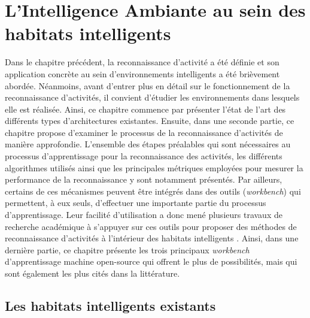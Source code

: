 \chapter{L'Intelligence Ambiante au sein des habitats intelligents}
\label{chap:2}

Dans le chapitre précédent, la reconnaissance d'activité a été définie et son application concrète au sein d'environnements intelligents a été brièvement abordée. Néanmoins, avant d'entrer plus en détail sur le fonctionnement de la reconnaissance d'activités, il convient d'étudier les environnements dans lesquels elle est réalisée. Ainsi, ce chapitre commence par présenter l'état de l'art des différents types d'architectures existantes. Ensuite, dans une seconde partie, ce chapitre propose d'examiner le processus de la reconnaissance d'activités de manière approfondie. L'ensemble des étapes préalables qui sont nécessaires au processus d'apprentissage pour la reconnaissance des activités, les différents algorithmes utilisés ainsi que les principales métriques employées pour mesurer la performance de la reconnaissance y sont notamment présentés. Par ailleurs, certains de ces mécanismes peuvent être intégrés dans des outils (\textit{workbench}) qui permettent, à eux seuls, d'effectuer une importante partie du processus d'apprentissage. Leur facilité d'utilisation a donc mené plusieurs travaux de recherche académique à s'appuyer sur ces outils pour proposer des méthodes de reconnaissance d'activités à l'intérieur des habitats intelligents \citep{Maurer2006, Shoaib2013, Ramirez-Prado2019}. Ainsi, dans une dernière partie, ce chapitre présente les trois principaux \textit{workbench} d'apprentissage machine open-source qui offrent le plus de possibilités, mais qui sont également les plus cités dans la littérature.

\section{Les habitats intelligents existants}

